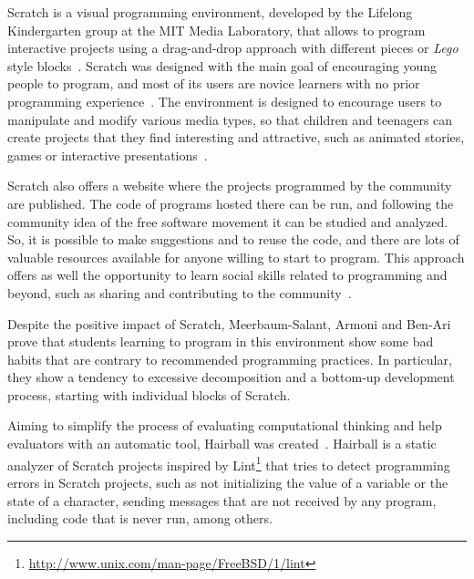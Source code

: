\documentclass[conference]{format/IEEEtran}
\begin{document}
Scratch is a visual programming environment, developed by the Lifelong Kindergarten group at the MIT Media Laboratory, that allows to program interactive projects using a drag-and-drop approach with different pieces or \textit {Lego} style blocks~\cite{resnick2009scratch}. Scratch was designed with the main goal of encouraging young people to program, and most of its users are novice learners with no prior programming experience~\cite{maloney2010scratch}. The environment is designed to encourage users to manipulate and modify various media types, so that children and teenagers can create projects that they find interesting and attractive, such as animated stories, games or interactive presentations~\cite{maloney2008programming}.

Scratch also offers a website where the projects programmed by the community are published. The code of programs hosted there can be run, and following the community idea of the free software movement it can be studied and analyzed. So, it is possible to make suggestions and to reuse the code, and there are lots of valuable resources available for anyone willing to start to program. This approach offers as well the opportunity to learn social skills related to programming and beyond, such as sharing and contributing to the community~\cite{scaffidi2012skill}.


Despite the positive impact of Scratch, Meerbaum-Salant, Armoni and Ben-Ari~\cite{meerbaum2011habits} prove that students learning to program in this environment show some bad habits that are contrary to recommended programming practices. In particular, they show a tendency to excessive decomposition and a bottom-up development process, starting with individual blocks of Scratch.

Aiming to simplify the process of evaluating computational thinking and help evaluators with an automatic tool, Hairball was created~\cite{boe2013hairball}. Hairball is a static analyzer of Scratch projects inspired by Lint\footnote{\url{http://www.unix.com/man-page/FreeBSD/1/lint}} that tries to detect programming errors in Scratch projects, such as not initializing the value of a variable or the state of a character, sending messages that are not received by any program, including code that is never run, among others.
\end{document}
